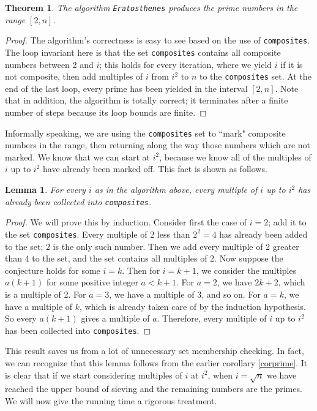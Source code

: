 \documentclass{amsart}
\newtheorem{thm}{Theorem}
\newtheorem{lem}{Lemma}
\theoremstyle{definition}
\theoremstyle{case}
\begin{document}
	\begin{thm}
		The algorithm \texttt{Eratosthenes} produces the prime numbers in the range $[2, n]$.
	\end{thm}
	\begin{proof}
		The algorithm's correctness is easy to see based on the use of \texttt{composites}. The loop invariant here is that the set \texttt{composites} contains all composite numbers between 2 and $i$; this holds for every iteration, where we yield $i$ if it is not composite, then add multiples of $i$ from $i^2$ to $n$ to the \texttt{composites} set. At the end of the last loop, every prime has been yielded in the interval $[2, n]$. Note that in addition, the algorithm is totally correct; it terminates after a finite number of steps because its loop bounds are finite.
	\end{proof}

	Informally speaking, we are using the \texttt{composites} set to ``mark" composite numbers in the range, then returning along the way those numbers which are not marked. We know that we can start at $i^2$, because we know all of the multiples of $i$ up to $i^2$ have already been marked off. This fact is shown as follows.
	
	\begin{lem}
		For every $i$ as in the algorithm above, every multiple of $i$ up to $i^2$ has already been collected into \texttt{composites}.
	\end{lem}
	\begin{proof}
		We will prove this by induction. Consider first the case of $i=2$; add it to the set \texttt{composites}. Every multiple of 2 less than $2^2 = 4$ has already been added to the set; 2 is the only such number. Then we add every multiple of 2 greater than 4 to the set, and the set contains all multiples of 2.
		Now suppose the conjecture holds for some $i=k$. Then for $i=k+1$, we consider the multiples $a(k+1)$ for some positive integer $a<k+1$. For $a=2$, we have $2k+2$, which is a multiple of 2. For $a=3$, we have a multiple of 3, and so on. For $a=k$, we have a multiple of $k$, which is already taken care of by the induction hypothesis. So every $a(k+1)$ gives a multiple of $a$. Therefore, every multiple of $i$ up to $i^2$ has been collected into \texttt{composites}.
	\end{proof}
	
	This result saves us from a lot of unnecessary set membership checking. In fact, we can recognize that this lemma follows from the earlier corollary \ref{corprime}. It is clear that if we start considering multiples of $i$ at $i^2$, when $i = \sqrt{n}$ we have reached the upper bound of sieving and the remaining numbers are the primes. We will now give the running time a rigorous treatment.
	
\end{document}
